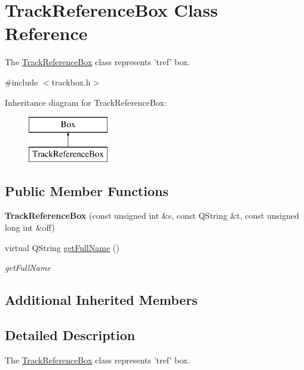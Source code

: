 \hypertarget{class_track_reference_box}{\section{Track\-Reference\-Box Class Reference}
\label{class_track_reference_box}
}


The \hyperlink{class_track_reference_box}{Track\-Reference\-Box} class represents 'tref' box.  




{\ttfamily \#include $<$trackbox.\-h$>$}

Inheritance diagram for Track\-Reference\-Box\-:\begin{figure}[H]
\begin{center}
\leavevmode
\includegraphics[height=2.000000cm]{class_track_reference_box}
\end{center}
\end{figure}
\subsection*{Public Member Functions}
\begin{DoxyCompactItemize}
\item 
\hypertarget{class_track_reference_box_abce7188f38f540bb6633e3bb95e6fc02}{{\bfseries Track\-Reference\-Box} (const unsigned int \&s, const Q\-String \&t, const unsigned long int \&off)}\label{class_track_reference_box_abce7188f38f540bb6633e3bb95e6fc02}

\item 
virtual Q\-String \hyperlink{class_track_reference_box_ae140565faf9eb4e95fd8ab3de418c308}{get\-Full\-Name} ()
\begin{DoxyCompactList}\small\item\em get\-Full\-Name \end{DoxyCompactList}\end{DoxyCompactItemize}
\subsection*{Additional Inherited Members}


\subsection{Detailed Description}
The \hyperlink{class_track_reference_box}{Track\-Reference\-Box} class represents 'tref' box. 

